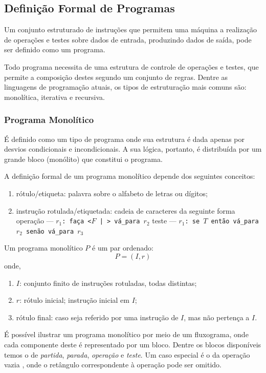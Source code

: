 \documentclass[12pt,fleqn]{article}
\begin{document}
\subsection{Definição Formal de Programas}
Um conjunto estruturado de instruções que permitem uma máquina a realização
de operações e testes sobre dados de entrada, produzindo dados de saída, pode
ser definido como um programa.

Todo programa necessita de uma estrutura de controle de operações e testes, que
permite a composição destes segundo um conjunto de regras. Dentre as linguagens
de programação atuais, os tipos de estruturação mais comuns são: monolítica,
iterativa e recursiva.

\subsubsection{Programa Monolítico}
É definido como um tipo de programa onde sua estrutura é dada apenas por
desvios condicionais e incondicionais. A sua lógica, portanto, é distribuída
por um grande bloco (monólito) que constitui o programa.

A definição formal de um programa monolítico depende dos seguintes conceitos:

\begin{enumerate}
    \item rótulo/etiqueta: palavra sobre o alfabeto de letras ou dígitos;
    \item instrução rotulada/etiquetada: cadeia de caracteres da seguinte forma
        \subitem operação --- \texttt{$r_1$: faça <$F$ | \checkmark>
        vá\_para
        $r_2$}
        \subitem \hspace{1.5em} teste --- \texttt{$r_1$: se $T$ então vá\_para
        $r_2$ senão vá\_para $r_3$}
\end{enumerate}

\noindent
Um programa monolítico $P$ é um par ordenado:
\[
    P = (I, r)
\]
onde,

\begin{enumerate}
    \item $I$: conjunto finito de instruções rotuladas, todas distintas;
    \item $r$: rótulo inicial; instrução inicial em $I$;
    \item rótulo final: caso seja referido por uma instrução de $I$, mas não
    pertença a $I$.
\end{enumerate}

É possível ilustrar um programa monolítico por meio de um fluxograma, onde cada
componente deste é representado por um bloco. Dentre os blocos disponíveis
temos o de \textit{partida}, \textit{parada}, \textit{operação} e
\textit{teste}. Um caso especial é o da operação vazia \checkmark, onde o
retângulo correspondente à operação pode ser omitido.
\end{document}
